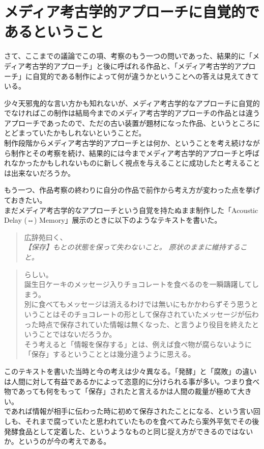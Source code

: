 \documentclass[a4paper,report]{jsbook}
\begin{document}
\section{メディア考古学的アプローチに自覚的であるということ}\label{ux30e1ux30c7ux30a3ux30a2ux8003ux53e4ux5b66ux7684ux30a2ux30d7ux30edux30fcux30c1ux306bux81eaux899aux7684ux3067ux3042ux308bux3068ux3044ux3046ux3053ux3068}

さて、ここまでの議論でこの項、考察のもう一つの問いであった、結果的に「メディア考古学的アプローチ」と後に呼ばれる作品と、「メディア考古学的アプローチ」に自覚的である制作によって何が違うかということへの答えは見えてきている。

少々天邪鬼的な言い方かも知れないが、メディア考古学的なアプローチに自覚的でなければこの制作は結局今までのメディア考古学的アプローチの作品とは違うアプローチであったので、ただの古い装置が題材になった作品、というところにとどまっていたかもしれないということだ。\\
制作段階からメディア考古学的アプローチとは何か、ということを考え続けながら制作とその考察を続け、結果的には今までメディア考古学的アプローチと呼ばれなかったかもしれないものに新しく視点を与えることに成功したと考えることは出来ないだろうか。

もう一つ、作品考察の終わりに自分の作品で前作から考え方が変わった点を挙げておきたい。\\
まだメディア考古学的なアプローチという自覚を持たぬまま制作した「Acoustic
Delay (⇔) Memory」展示のときに以下のようなテキストを書いた。

\begin{quote}
広辞苑曰く、\\
\emph{【保存】もとの状態を保って失わないこと。
原状のままに維持すること。}
\end{quote}

\begin{quote}
らしい。\\
誕生日ケーキのメッセージ入りチョコレートを食べるのを一瞬躊躇してしまう。\\
別に食べてもメッセージは消えるわけでは無いにもかかわらずそう思うということはそのチョコレートの形として保存されていたメッセージが伝わった時点で保存されていた情報は無くなった、と言うより役目を終えたということではないだろうか。\\
そう考えると「情報を保存する」とは、例えば食べ物が腐らないように「保存」するということとは幾分違うように思える。
\end{quote}

このテキストを書いた当時と今の考えは少々異なる。「発酵」と「腐敗」の違いは人間に対して有益であるかによって恣意的に分けられる事が多い。つまり食べ物であっても何をもって「保存」されたと言えるかは人間の裁量が極めて大きい。\\
であれば情報が相手に伝わった時に初めて保存されたことになる、という言い回しも、それまで腐っていたと思われていたものを食べてみたら案外平気でその後発酵食品として定着した、というようなものと同じ捉え方ができるのではないか。というのが今の考えである。
\end{document}
